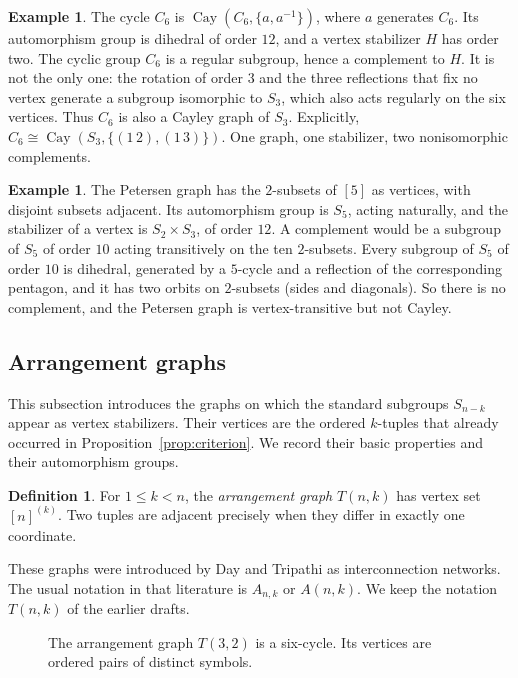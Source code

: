 \documentclass[12pt,letterpaper]{article}
\numberwithin{equation}{section}
\theoremstyle{definition}
\newtheorem{definition}[theorem]{Definition}
\newtheorem{example}[theorem]{Example}
\DeclareMathOperator{\cayy}{Cay}
\begin{document}
\begin{example}\label{ex:c6}
The cycle $C_6$ is $\cayy(C_6,\{a,a^{-1}\})$, where $a$ generates $C_6$. Its automorphism group is dihedral of order $12$, and a vertex stabilizer $H$ has order two. The cyclic group $C_6$ is a regular subgroup, hence a complement to $H$. It is not the only one: the rotation of order $3$ and the three reflections that fix no vertex generate a subgroup isomorphic to $S_3$, which also acts regularly on the six vertices. Thus $C_6$ is also a Cayley graph of $S_3$. Explicitly, $C_6\cong\cayy(S_3,\{(1\,2),(1\,3)\})$. One graph, one stabilizer, two nonisomorphic complements.
\end{example}
\begin{example}\label{ex:petersen}
The Petersen graph has the $2$-subsets of $[5]$ as vertices, with disjoint subsets adjacent. Its automorphism group is $S_5$, acting naturally, and the stabilizer of a vertex is $S_2\times S_3$, of order $12$. A complement would be a subgroup of $S_5$ of order $10$ acting transitively on the ten $2$-subsets. Every subgroup of $S_5$ of order $10$ is dihedral, generated by a $5$-cycle and a reflection of the corresponding pentagon, and it has two orbits on $2$-subsets (sides and diagonals). So there is no complement, and the Petersen graph is vertex-transitive but not Cayley.
\end{example}

\subsection{Arrangement graphs}
This subsection introduces the graphs on which the standard subgroups $S_{n-k}$ appear as vertex stabilizers. Their vertices are the ordered $k$-tuples that already occurred in Proposition~\ref{prop:criterion}. We record their basic properties and their automorphism groups.
\begin{definition}
For $1\leq k<n$, the \emph{arrangement graph} $T(n,k)$ has vertex set $[n]^{(k)}$. Two tuples are adjacent precisely when they differ in exactly one coordinate.
\end{definition}
These graphs were introduced by Day and Tripathi \cite{DT92} as interconnection networks. The usual notation in that literature is $A_{n,k}$ or $A(n,k)$. We keep the notation $T(n,k)$ of the earlier drafts.

\begin{figure}[ht]\centering
{}
\caption{The arrangement graph $T(3,2)$ is a six-cycle. Its vertices are ordered pairs of distinct symbols.}\label{fig:t32}
\end{figure}
\end{document}
